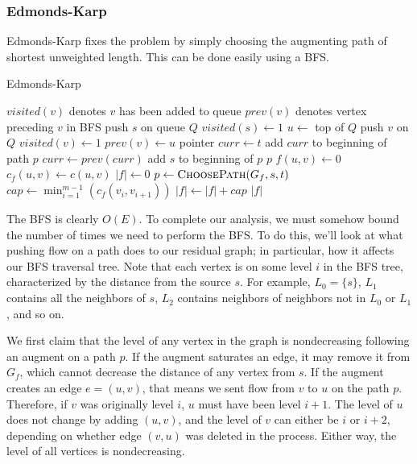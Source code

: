\subsubsection{Edmonds-Karp}

Edmonds-Karp fixes the problem by simply choosing the augmenting path of shortest unweighted length. This can be done easily using a BFS.

\begin{algorithm}[H]
\caption{Edmonds-Karp}
\begin{algorithmic}
	\State $visited(v)$ denotes $v$ has been added to queue
	\State $prev(v)$ denotes vertex preceding $v$ in BFS
	\State push $s$ on queue $Q$
	\State $visited(s) \gets 1$
		\State $u \gets $ top of $Q$
			\State push $v$ on $Q$
			\State $visited(v) \gets 1$
			\State $prev(v) \gets u$
		\EndFor
	\EndWhile
	\State pointer $curr \gets t$
		\State add $curr$ to beginning of path $p$
		\State $curr \gets prev(curr)$
	\EndWhile
	\State add $s$ to beginning of $p$
	\State \Return $p$
\EndFunction
{}
		\State $f(u,v) \gets 0$
		\State $c_f(u,v) \gets c(u,v)$
	\EndFor
	\State $|f| \gets 0$
		\State $p \gets \Call{ChoosePath}{G_f,s,t}$
		\State $cap \gets \min_{i=1}^{m-1}(c_f(v_i,v_{i+1}))$
		\State $|f| \gets |f| + cap$
		\State {}
	\EndWhile
	\Return $|f|$
\EndFunction
\end{algorithmic}
\end{algorithm}

The BFS is clearly $O(E)$. To complete our analysis, we must somehow bound the number of times we need to perform the BFS. To do this, we'll look at what pushing flow on a path does to our residual graph; in particular, how it affects our BFS traversal tree. Note that each vertex is on some level $i$ in the BFS tree, characterized by the distance from the source $s$. For example, $L_0 = \{s\}$, $L_1$ contains all the neighbors of $s$, $L_2$ contains neighbors of neighbors not in $L_0$ or $L_1$, and so on.

We first claim that the level of any vertex in the graph is nondecreasing following an augment on a path $p$. If the augment saturates an edge, it may remove it from $G_f$, which cannot decrease the distance of any vertex from $s$. If the augment creates an edge $e=(u,v)$, that means we sent flow from $v$ to $u$ on the path $p$. Therefore, if $v$ was originally level $i$, $u$ must have been level $i+1$. The level of $u$ does not change by adding $(u,v)$, and the level of $v$ can either be $i$ or $i+2$, depending on whether edge $(v,u)$ was deleted in the process. Either way, the level of all vertices is nondecreasing.

